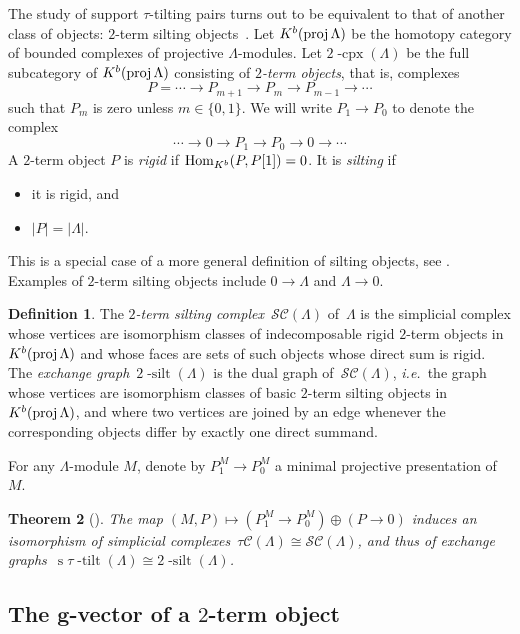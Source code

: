 \documentclass{amsart}
\newtheorem{theorem}{Theorem}%
\theoremstyle{definition}
\newtheorem{definition}[theorem]{Definition}
\renewcommand{\b}[1]{\mathbf{#1}} %
\newcommand{\ie}{\textit{i.e.}~} %
\newcommand{\darkblue}{\color{darkblue}} %
\newcommand{\defn}[1]{\textsl{\darkblue #1}} %
\newcommand{\stau}{\operatorname{s} \! \tau \! \operatorname{-tilt}}
\newcommand{\cpx}{2 \! \operatorname{-cpx}}
\newcommand{\silt}{2 \! \operatorname{-silt}}
\newcommand{\siltingComplex}{\mathcal{SC}}
\newcommand{\tiltingComplex}{\tau\mathcal{C}}
\newcommand{\proj}{\operatorname{{\rm proj }}}
\newcommand{\Hom}[1]{\operatorname{{\rm Hom}}_{#1}}
\begin{document}
The study of support $\tau$-tilting pairs turns out to be equivalent to that of another class of objects: $2$-term silting objects~\cite[Sect.~3]{AdachiIyamaReiten}.
Let $K^b(\proj \Lambda)$ be the homotopy category of bounded complexes of projective $\Lambda$-modules. 
Let $\cpx(\Lambda)$ be the full subcategory of $K^b(\proj \Lambda)$ consisting of \defn{$2$-term objects}, that is, complexes
\[
 P = \cdots \to P_{m+1} \to P_m \to P_{m-1} \to \cdots
\]
such that $P_m$ is zero unless $m\in \{0,1\}$.  
We will write $P_1\to P_0$ to denote the complex
\[
\cdots \to 0 \to P_1 \to P_0 \to 0 \to \cdots
\]
A $2$-term object $P$ is \defn{rigid} if $\Hom{K^b}(P, P[1]) = 0$.  It is \defn{silting} if
\begin{itemize}
 \item it is rigid, and 
 \item $|P| = |\Lambda|$.
\end{itemize}
This is a special case of a more general definition of silting objects, see \cite{}.
Examples of $2$-term silting objects include $0\to \Lambda$ and $\Lambda \to 0$.

\begin{definition}
The \defn{$2$-term silting complex}~$\siltingComplex(\Lambda)$ of~$\Lambda$ is the simplicial complex whose vertices are isomorphism classes of indecomposable rigid $2$-term objects in $K^b(\proj \Lambda)$ and whose faces are sets of such objects whose direct sum is rigid.
The \defn{exchange graph}~$\silt(\Lambda)$ is the dual graph of~$\siltingComplex(\Lambda)$, \ie the graph whose vertices are isomorphism classes of basic $2$-term silting objects in $K^b(\proj \Lambda)$, and where two vertices are joined by an edge whenever the corresponding objects differ by exactly one direct summand.
\end{definition}

For any $\Lambda$-module $M$, denote by $P_1^M\to P_0^M$ a minimal projective presentation of $M$.

\begin{theorem}[{\cite[Thm.~3.2]{AdachiIyamaReiten}}]
The map $(M,P) \mapsto (P_1^M\to P_0^M) \oplus (P\to 0)$ induces an isomorphism of simplicial complexes~$\tiltingComplex(\Lambda) \cong \siltingComplex(\Lambda)$, and thus of exchange graphs~${\stau(\Lambda) \cong \silt(\Lambda)}$.
\end{theorem}


\subsection{The $\b{g}$-vector of a $2$-term object}
\end{document}
